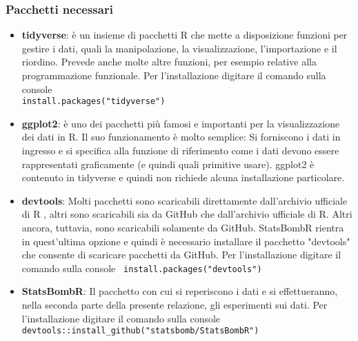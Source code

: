         \subsubsection{Pacchetti necessari}
        \begin{itemize}
            \item \textbf{tidyverse}: è un insieme di pacchetti R che mette a disposizione funzioni per gestire i dati, quali la manipolazione, la visualizzazione, l'importazione e il riordino. Prevede anche molte altre funzioni, per esempio relative alla programmazione funzionale. Per l'installazione digitare il comando sulla console \\ \texttt{install.packages("tidyverse")}
            
            \item \textbf{ggplot2}: è uno dei pacchetti più famosi e importanti per la visualizzazione dei dati in R. Il suo funzionamento è molto semplice: Si forniscono i dati in ingresso e si specifica alla funzione di riferimento come i dati devono essere rappresentati graficamente (e quindi quali primitive usare). ggplot2 è contenuto in tidyverse e quindi non richiede alcuna installazione particolare.
            
            \item \textbf{devtools}: Molti pacchetti sono scaricabili direttamente dall'archivio ufficiale di R \cite{CRAN}, altri sono scaricabili sia da GitHub che dall'archivio ufficiale di R. Altri ancora, tuttavia, sono scaricabili solamente da GitHub. StatsBombR rientra in quest'ultima opzione e quindi è necessario installare il pacchetto "devtools" che consente di scaricare pacchetti da GitHub. Per l'installazione digitare il comando sulla console \texttt{ install.packages("devtools")}

            \item \textbf{StatsBombR}: Il pacchetto con cui si reperiscono i dati e si effettueranno, nella seconda parte della presente relazione, gli esperimenti sui dati. Per l'installazione digitare il comando sulla console \\ \texttt{devtools::install\_github("statsbomb/StatsBombR")}
        \end{itemize}
        
